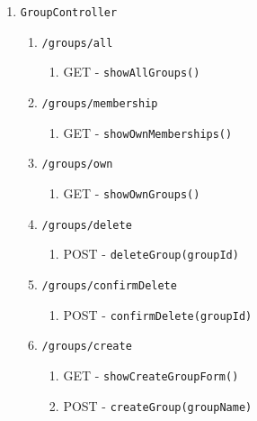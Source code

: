 \documentclass[12pt,DIV14,BCOR10mm,a4paper,parskip=half-,headsepline,headinclude,english,ngerman,bibliography=totocnumbered]{scrreprt}
\begin{document}
\begin{enumerate}
\begin{enumerate}
    \item \texttt{GroupController}
    \begin{enumerate}
      \item \texttt{/groups/all}
      \begin{enumerate}
        \item GET - \texttt{showAllGroups()}
      \end{enumerate}
      \item \texttt{/groups/membership}
      \begin{enumerate}
        \item GET - \texttt{showOwnMemberships()}
      \end{enumerate}
      \item \texttt{/groups/own}
      \begin{enumerate}
        \item GET - \texttt{showOwnGroups()}
      \end{enumerate}
      \item \texttt{/groups/delete}
      \begin{enumerate}
        \item POST - \texttt{deleteGroup(groupId)}
      \end{enumerate}
      \item \texttt{/groups/confirmDelete}
      \begin{enumerate}
        \item POST - \texttt{confirmDelete(groupId)}
      \end{enumerate}
      \item \texttt{/groups/create}
      \begin{enumerate}
        \item GET - \texttt{showCreateGroupForm()}
        \item POST - \texttt{createGroup(groupName)}
      \end{enumerate}


\end{enumerate}
\end{enumerate}
\end{enumerate}
\end{document}
